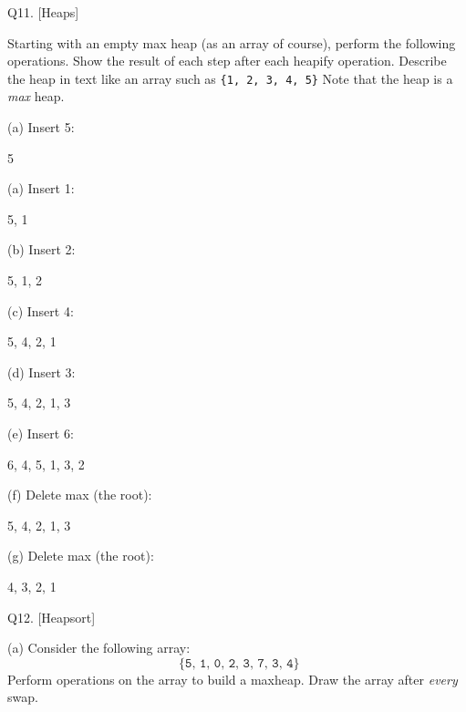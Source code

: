 \newpage
Q11. [Heaps]

Starting with an empty max heap (as an array of course),
perform the following operations.
Show the result of each step after each heapify operation.
Describe the heap in text like an array such as \verb!{1, 2, 3, 4, 5}!
Note that the heap is a \textit{max} heap.


(a) Insert 5:
\\
\ANSWER
\begin{answercode}
{5}
\end{answercode}


(a) Insert 1:
\\
\ANSWER
\begin{answercode}
{5, 1}
\end{answercode}

(b) Insert 2:
\\
\ANSWER
\begin{answercode}
{5, 1, 2}
\end{answercode}

(c) Insert 4:
\\
\ANSWER
\begin{answercode}
{5, 4, 2, 1}
\end{answercode}

(d) Insert 3:
\\
\ANSWER
\begin{answercode}
{5, 4, 2, 1, 3}
\end{answercode}

(e) Insert 6:
\\
\ANSWER
\begin{answercode}
{6, 4, 5, 1, 3, 2}
\end{answercode}

(f) Delete max (the root):
\\
\ANSWER
\begin{answercode}
{5, 4, 2, 1, 3}
\end{answercode}

(g) Delete max (the root):
\\
\ANSWER
\begin{answercode}
{4, 3, 2, 1}
\end{answercode}




\newpage
Q12. [Heapsort]

(a)
Consider the following array:
\[
\texttt{ \{5, 1, 0, 2, 3, 7, 3, 4\} }
\]
Perform operations on the array to build a maxheap.
Draw the array after \textit{every} swap.

